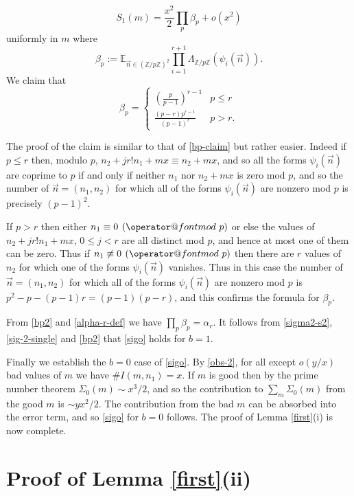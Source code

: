 \documentclass[11pt]{amsart}
\makeatletter
\numberwithin{equation}{section}  %
\theoremstyle{remark}
\theoremstyle{plain}
\numberwithin{equation}{section}
\newcommand{\Z}{\mathbb{Z}}
\newcommand{\E}{\mathbb{E}}  %
\renewcommand{\pmod}[1]{\allowbreak\mkern7mu({\operator@font mod}\,\,#1)}
\renewcommand{\leq}{\leqslant}
\renewcommand{\(}{\left(}
\renewcommand{\)}{\right)}
\newcommand{\asym}{\sim}   %
\newcommand{\vect}[1]{{\ensuremath{\vec{#1}}}}
\makeatother
\begin{document}
\begin{equation}\label{sig-2-single} S_1(m) = \frac{x^2}{2} \prod_p \beta_p + o(x^2)\end{equation} uniformly in $m$
where
\[ \beta_p := \E_{\vect{n} \in (\Z/p\Z)^2} \prod_{i = 1}^{r+1} \Lambda_{\Z/p\Z} (\psi_i(\vect{n})).\]
We claim that
\begin{equation}\label{bp2} \beta_p = \left\{ \begin{array}{ll} (\frac{p}{p-1})^{r-1} & p \leq r \\ \frac{(p-r)p^{r-1}}{(p-1)^r} & p > r.\end{array}  \right. \end{equation}

The proof of the claim is similar to that of \eqref{bp-claim} but rather easier. Indeed if $p \leq r$ then, modulo $p$, $n_2 + jr! n_1 + mx \equiv n_2 + mx$, and so all the forms $\psi_i(\vect{n})$ are coprime to $p$ if and only if neither $n_1$ nor $n_2 +
 mx$ is zero mod $p$, and so the number of $\vect{n} = (n_1, n_2)$ for which all of the forms $\psi_i(\vect{n})$ are nonzero mod $p$ is precisely $(p-1)^2$.

If $p > r$ then either $n_1 \equiv 0 \pmod{p}$ or else the values of $n_2 + jr! n_1 + mx$, $0 \leq j < r$ are all distinct mod $p$, and hence at most one of them can be zero. Thus if $n_1 \not\equiv 0 \pmod{p}$ then there are $r$ values of $n_2$ for which one
 of the forms $\psi_i(\vect{n})$ vanishes. Thus in this case the number of $\vect{n} = (n_1, n_2)$ for which all of the forms $\psi_i(\vect{n})$ are nonzero mod $p$ is $p^2 - p - (p-1)r = (p-1)(p-r)$, and this confirms the formula for $\beta_p$.

From \eqref{bp2} and \eqref{alpha-r-def} we have $\prod_p \beta_p =
\alpha_r$. It follows from \eqref{sigma2-s2}, \eqref{sig-2-single}
and \eqref{bp2} that \eqref{sigo} holds for $b=1$.

Finally we establish the $b=0$ case of \eqref{sigo}. By \eqref{obs-2}, for all except $o(y/x)$ bad values of $m$ we have $\# I(m,n_1) = x$. If $m$ is good then by the prime number theorem $\Sigma_0(m) \asym x^3/2$, and so the contribution to
$\sum_m \Sigma_0(m)$ from the good $m$ is $\asym yx^2/2$. The contribution from the bad $m$ can be absorbed into the error term, and so \eqref{sigo} for $b=0$ follows.  The proof of Lemma \ref{first}(i) is now complete.

\section{Proof of Lemma \ref{first}(ii)}\label{second-lemma-sec}
\end{document}
